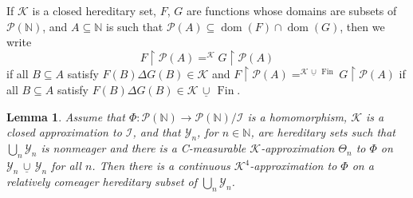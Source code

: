 \documentclass{amsart}
\def\Fin{{\rm Fin}}   %
\DeclareMathOperator{\dom}{dom}
\def\rs{\restriction}
\newtheorem{lemma}[proposition]{Lemma}
\theoremstyle{definition}
\theoremstyle{remark}
\newcommand{\ucup}{\,\underline{\cup}\,}
\def\Fin{\operatorname{Fin}}
\newcommand{\cK}{{\mathcal K}}
\newcommand{\cP}{\mathcal P}
\newcommand{\bbN}{\mathbb N}
\newcommand{\cI}{{\mathcal I}} %
\newcommand{\cY}{\mathcal Y}
\newcommand{\cPN}{\cP(\bbN)}
\numberwithin{claim}{subsection}
\begin{document}
If $\cK$ is a closed hereditary set, $F$, $G$ are functions whose domains are subsets of $\cP(\bbN)$, and $A\subseteq \bbN$ is such that $\cP(A)\subseteq \dom(F)\cap \dom(G)$, then we write 
\begin{equation}\label{eq.FrsP(A)}
F\rs \cP(A)=^\cK G\rs \cP(A)
\end{equation}
if all $B\subseteq A$ satisfy $F(B)\Delta G(B)\in \cK$
and 
$F\rs \cP(A)=^{\cK\ucup \Fin} G\rs \cP(A)$ if all $B\subseteq A$ satisfy $F(B)\Delta G(B)\in \cK\ucup \Fin$. 


\begin{lemma}\label{L.approximation.nonmeager}
	Assume that $\Phi\colon \cPN\to \cPN/\cI$ is a homomorphism, $\cK$ is a closed approximation to $\cI$,  and that $\cY_n$, for $n\in \bbN$, are hereditary sets such that $\bigcup_n \cY_n$ is nonmeager and there is a C-measurable $\cK$-approximation $\Theta_n$ to $\Phi$ on $\cY_n\ucup \cY_n$ for all $n$. 
	Then there is a continuous  $\cK^4$-approximation to $\Phi$ on  a relatively comeager hereditary subset of $\bigcup_n \cY_n$. 
\end{lemma}
\end{document}
